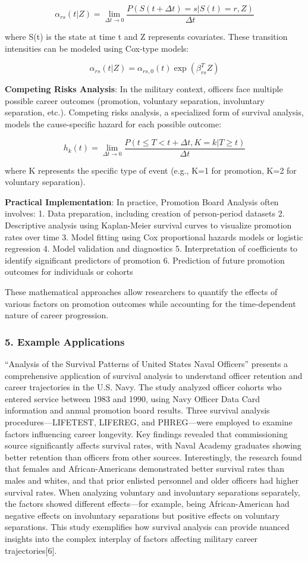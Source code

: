 \documentclass[./main.tex]{subfiles}
\begin{document}
\[ \alpha_{rs}(t|Z) = \lim_{\Delta t \to 0} \frac{P(S(t + \Delta t) = s | S(t) = r, Z)}{\Delta t} \]

where S(t) is the state at time t and Z represents covariates. These
transition intensities can be modeled using Cox-type models:

\[ \alpha_{rs}(t|Z) = \alpha_{rs,0}(t) \exp(\beta_{rs}^T Z) \]

\textbf{Competing Risks Analysis}: In the military context, officers
face multiple possible career outcomes (promotion, voluntary separation,
involuntary separation, etc.). Competing risks analysis, a specialized
form of survival analysis, models the cause-specific hazard for each
possible outcome:

\[ h_k(t) = \lim_{\Delta t \to 0} \frac{P(t \leq T < t + \Delta t, K = k | T \geq t)}{\Delta t} \]

where K represents the specific type of event (e.g., K=1 for promotion,
K=2 for voluntary separation).

\textbf{Practical Implementation}: In practice, Promotion Board Analysis
often involves: 1. Data preparation, including creation of person-period
datasets 2. Descriptive analysis using Kaplan-Meier survival curves to
visualize promotion rates over time 3. Model fitting using Cox
proportional hazards models or logistic regression 4. Model validation
and diagnostics 5. Interpretation of coefficients to identify
significant predictors of promotion 6. Prediction of future promotion
outcomes for individuals or cohorts

These mathematical approaches allow researchers to quantify the effects
of various factors on promotion outcomes while accounting for the
time-dependent nature of career progression.

\subsubsection{5. Example Applications}\label{example-applications}

``Analysis of the Survival Patterns of United States Naval Officers''
presents a comprehensive application of survival analysis to understand
officer retention and career trajectories in the U.S. Navy. The study
analyzed officer cohorts who entered service between 1983 and 1990,
using Navy Officer Data Card information and annual promotion board
results. Three survival analysis procedures---LIFETEST, LIFEREG, and
PHREG---were employed to examine factors influencing career longevity.
Key findings revealed that commissioning source significantly affects
survival rates, with Naval Academy graduates showing better retention
than officers from other sources. Interestingly, the research found that
females and African-Americans demonstrated better survival rates than
males and whites, and that prior enlisted personnel and older officers
had higher survival rates. When analyzing voluntary and involuntary
separations separately, the factors showed different effects---for
example, being African-American had negative effects on involuntary
separations but positive effects on voluntary separations. This study
exemplifies how survival analysis can provide nuanced insights into the
complex interplay of factors affecting military career
trajectories{[}6{]}.
\end{document}

